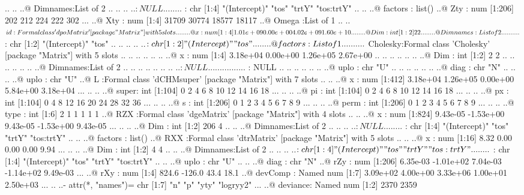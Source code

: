\documentclass[12pt]{article}
\begin{document}
\begin{Schunk}
\begin{Soutput}
  .. .. ..@ Dimnames:List of 2
  .. .. .. ..$ : NULL
  .. .. .. ..$ : chr [1:4] "(Intercept)" "tos" "trtY" "tos:trtY"
  .. .. ..@ factors : list()
  ..@ Zty     : num [1:206] 202 212 224 222 302 ...
  ..@ Xty     : num [1:4] 31709 30774 18577 18117
  ..@ Omega   :List of 1
  .. ..$ id:Formal class 'dpoMatrix' [package "Matrix"] with 5 slots
  .. .. .. ..@ x       : num [1:4] 1.01e+09 0.00e+00 4.02e+09 1.60e+10
  .. .. .. ..@ Dim     : int [1:2] 2 2
  .. .. .. ..@ Dimnames:List of 2
  .. .. .. .. ..$ : chr [1:2] "(Intercept)" "tos"
  .. .. .. .. ..$ : chr [1:2] "(Intercept)" "tos"
  .. .. .. ..@ factors :List of 1
  .. .. .. .. ..$ Cholesky:Formal class 'Cholesky' [package "Matrix"] with 5 slots
  .. .. .. .. .. .. ..@ x       : num [1:4] 3.18e+04 0.00e+00 1.26e+05 2.67e+00
  .. .. .. .. .. .. ..@ Dim     : int [1:2] 2 2
  .. .. .. .. .. .. ..@ Dimnames:List of 2
  .. .. .. .. .. .. .. ..$ : NULL
  .. .. .. .. .. .. .. ..$ : NULL
  .. .. .. .. .. .. ..@ uplo    : chr "U"
  .. .. .. .. .. .. ..@ diag    : chr "N"
  .. .. .. ..@ uplo    : chr "U"
  ..@ L       :Formal class 'dCHMsuper' [package "Matrix"] with 7 slots
  .. .. ..@ x    : num [1:412] 3.18e+04 1.26e+05 0.00e+00 5.84e+00 3.18e+04 ...
  .. .. ..@ super: int [1:104] 0 2 4 6 8 10 12 14 16 18 ...
  .. .. ..@ pi   : int [1:104] 0 2 4 6 8 10 12 14 16 18 ...
  .. .. ..@ px   : int [1:104] 0 4 8 12 16 20 24 28 32 36 ...
  .. .. ..@ s    : int [1:206] 0 1 2 3 4 5 6 7 8 9 ...
  .. .. ..@ perm : int [1:206] 0 1 2 3 4 5 6 7 8 9 ...
  .. .. ..@ type : int [1:6] 2 1 1 1 1 1
  ..@ RZX     :Formal class 'dgeMatrix' [package "Matrix"] with 4 slots
  .. .. ..@ x       : num [1:824]  9.43e-05 -1.53e+00  9.43e-05 -1.53e+00  9.43e-05 ...
  .. .. ..@ Dim     : int [1:2] 206 4
  .. .. ..@ Dimnames:List of 2
  .. .. .. ..$ : NULL
  .. .. .. ..$ : chr [1:4] "(Intercept)" "tos" "trtY" "tos:trtY"
  .. .. ..@ factors : list()
  ..@ RXX     :Formal class 'dtrMatrix' [package "Matrix"] with 5 slots
  .. .. ..@ x       : num [1:16] 8.32 0.00 0.00 0.00 9.94 ...
  .. .. ..@ Dim     : int [1:2] 4 4
  .. .. ..@ Dimnames:List of 2
  .. .. .. ..$ : chr [1:4] "(Intercept)" "tos" "trtY" "tos:trtY"
  .. .. .. ..$ : chr [1:4] "(Intercept)" "tos" "trtY" "tos:trtY"
  .. .. ..@ uplo    : chr "U"
  .. .. ..@ diag    : chr "N"
  ..@ rZy     : num [1:206]  6.35e-03 -1.01e+02  7.04e-03 -1.14e+02  9.49e-03 ...
  ..@ rXy     : num [1:4]  824.6 -126.0   43.4   18.1
  ..@ devComp : Named num [1:7] 3.09e+02 4.00e+00 3.33e+06 1.00e+01 2.50e+03 ...
  .. ..- attr(*, "names")= chr [1:7] "n" "p" "yty" "logryy2" ...
  ..@ deviance: Named num [1:2] 2370 2359

\end{Soutput}
\end{Schunk}
\end{document}
